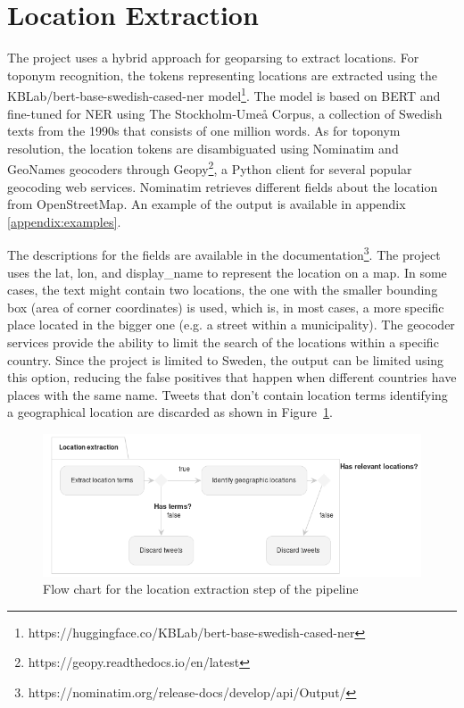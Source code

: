 \section{Location Extraction}

The project uses a hybrid approach for geoparsing to extract locations. For toponym recognition, the
tokens representing locations are extracted using the KBLab/bert-base-swedish-cased-ner
model\footnote{https://huggingface.co/KBLab/bert-base-swedish-cased-ner}. The model is based on BERT
and fine-tuned for \ac{NER} using The Stockholm-Umeå Corpus, a collection of Swedish texts from the
1990s that consists of one million words. As for toponym resolution, the location tokens are
disambiguated using Nominatim and GeoNames geocoders through
Geopy\footnote{https://geopy.readthedocs.io/en/latest}, a Python client for several
popular geocoding web services. Nominatim retrieves different fields about the
location from OpenStreetMap. An example of the output is available in appendix
\ref{appendix:examples}.


The descriptions for the fields are available in the
documentation\footnote{https://nominatim.org/release-docs/develop/api/Output/}. The project uses
the lat, lon, and display\_name to represent the location on a map. In some cases, the text might
contain two locations, the one with the smaller bounding box (area of corner coordinates) is used,
which is, in most cases, a more specific place located in the bigger one (e.g. a street within a
municipality). The geocoder services provide the ability to limit the search of the locations
within a specific country. Since the project is limited to Sweden, the output can be limited using
this option, reducing the false positives that happen when different countries have places with
the same name. Tweets that don't contain location terms identifying a geographical
location are discarded as shown in Figure~\ref{fig:flow_chart_location_extraction}.

\begin{figure}[H]
  \begin{center}
    \includegraphics[width=\columnwidth]{./images/location_extraction.png}
  \end{center}
  \caption{Flow chart for the location extraction step of the pipeline}
  \label{fig:flow_chart_location_extraction}
\end{figure}


